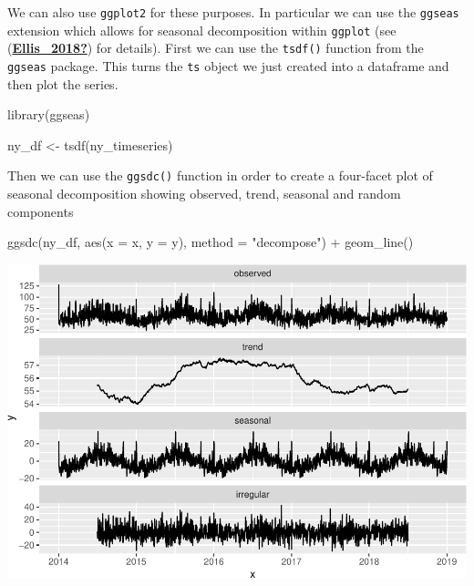 \documentclass[
]{book}
\makeatletter
\newenvironment{Shaded}{\begin{snugshade}}{\end{snugshade}}
\newcommand{\AttributeTok}[1]{\textcolor[rgb]{0.61,0.61,0.61}{#1}}
\newcommand{\FunctionTok}[1]{\textcolor[rgb]{0,0,0}{#1}}
\newcommand{\NormalTok}[1]{#1}
\newcommand{\OtherTok}[1]{\textcolor[rgb]{0.37,0.37,0.37}{#1}}
\newcommand{\SpecialCharTok}[1]{\textcolor[rgb]{0,0,0}{#1}}
\newcommand{\StringTok}[1]{\textcolor[rgb]{0.5,0.5,0.5}{#1}}
\newenvironment{kframe}{%
\medskip{}
\setlength{\fboxsep}{.8em}
 \def\at@end@of@kframe{}%
 \ifinner\ifhmode%
  \def\at@end@of@kframe{\end{minipage}}%
  \begin{minipage}{\columnwidth}%
 \fi\fi%
 \def\FrameCommand##1{\hskip\@totalleftmargin \hskip-\fboxsep
 \colorbox{shadecolor}{##1}\hskip-\fboxsep
     \hskip-\linewidth \hskip-\@totalleftmargin \hskip\columnwidth}%
 \MakeFramed {\advance\hsize-\width
   \@totalleftmargin\z@ \linewidth\hsize
   \@setminipage}}%
 {\par\unskip\endMakeFramed%
 \at@end@of@kframe}
\renewenvironment{Shaded}{\begin{kframe}}{\end{kframe}}
\makeatother
\begin{document}
We can also use \texttt{ggplot2} for these purposes. In particular we can use the \texttt{ggseas} extension which allows for seasonal decomposition within \texttt{ggplot} (see (\protect\hyperlink{ref-Ellis_2018}{\textbf{Ellis\_2018?}}) for details). First we can use the \texttt{tsdf()} function from the \texttt{ggseas} package. This turns the \texttt{ts} object we just created into a dataframe and then plot the series.

\begin{Shaded}
\begin{Highlighting}[]
\FunctionTok{library}\NormalTok{(ggseas)}

\NormalTok{ny\_df }\OtherTok{\textless{}{-}} \FunctionTok{tsdf}\NormalTok{(ny\_timeseries)}
\end{Highlighting}
\end{Shaded}

Then we can use the \texttt{ggsdc()} function in order to create a four-facet plot of seasonal decomposition showing observed, trend, seasonal and random components

\begin{Shaded}
\begin{Highlighting}[]
\FunctionTok{ggsdc}\NormalTok{(ny\_df, }\FunctionTok{aes}\NormalTok{(}\AttributeTok{x =}\NormalTok{ x, }\AttributeTok{y =}\NormalTok{ y), }
      \AttributeTok{method =} \StringTok{"decompose"}\NormalTok{) }\SpecialCharTok{+}
   \FunctionTok{geom\_line}\NormalTok{()}
\end{Highlighting}
\end{Shaded}

\includegraphics{crime_mapping_files/figure-latex/unnamed-chunk-177-1.pdf}
\end{document}
